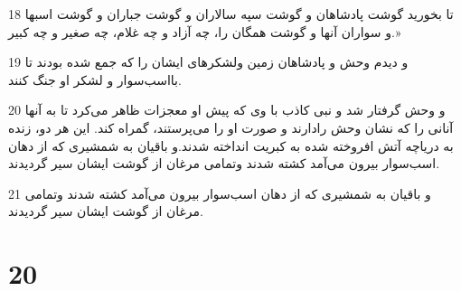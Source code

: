 \par 18 تا بخورید گوشت پادشاهان و گوشت سپه سالاران و گوشت جباران و گوشت اسبها و سواران آنها و گوشت همگان را، چه آزاد و چه غلام، چه صغیر و چه کبیر.»
\par 19 و دیدم وحش و پادشاهان زمین ولشکرهای ایشان را که جمع شده بودند تا بااسب‌سوار و لشکر او جنگ کنند.
\par 20 و وحش گرفتار شد و نبی کاذب با وی که پیش او معجزات ظاهر می‌کرد تا به آنها آنانی را که نشان وحش رادارند و صورت او را می‌پرستند، گمراه کند. این هر دو، زنده به دریاچه آتش افروخته شده به کبریت انداخته شدند.و باقیان به شمشیری که از دهان اسب‌سوار بیرون می‌آمد کشته شدند وتمامی مرغان از گوشت ایشان سیر گردیدند.
\par 21 و باقیان به شمشیری که از دهان اسب‌سوار بیرون می‌آمد کشته شدند وتمامی مرغان از گوشت ایشان سیر گردیدند.

\chapter{20}

